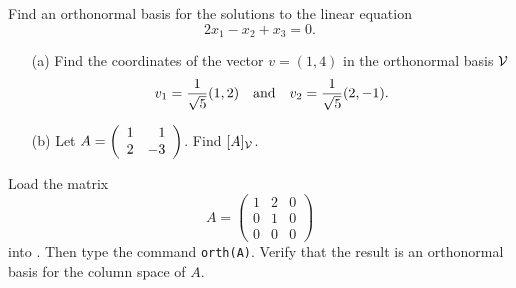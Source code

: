 \documentclass{ximera}
\begin{document}
\EXER

\TEXER

\begin{exercise} \label{c7.4.1}
Find an orthonormal basis for the solutions to the linear equation
\[
2x_1-x_2+x_3=0.
\]
\end{exercise}

\begin{exercise} \label{c7.4.2}
\begin{itemize}
\item[(a)] Find the coordinates of the vector $v=(1,4)$ in the orthonormal
basis ${\cal V}$
\[
v_1 = \frac{1}{\sqrt{5}}(1,2) \quad\mbox{and}\quad v_2 = \frac{1}{\sqrt{5}}(2,-1).
\]
\item[(b)]  Let $A=\left(\begin{array}{rr} 1 & 1\\ 2 &-3\end{array}\right)$. Find $[A]_{\cal V}$.
\end{itemize}
\end{exercise}




\CEXER

\begin{exercise} \label{c7.4.3}
Load the matrix
\[
A=\left(\begin{array}{rrr} 1 & 2 & 0\\ 0 & 1 & 0\\
0 & 0 & 0\end{array}\right)
\]
into \Matlabp.  Then type the command {\tt orth(A)}.
Verify that the result is an orthonormal basis for the column space of $A$.
\end{exercise}
\end{document}
